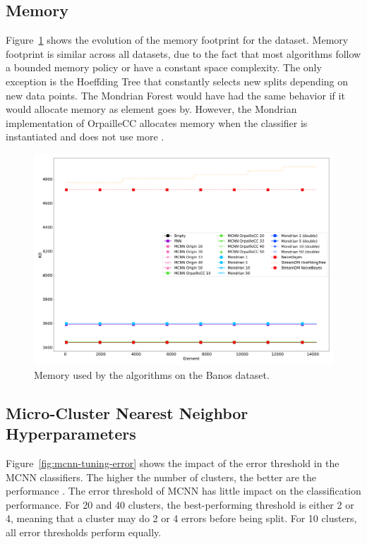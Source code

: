 \subsection{Memory}
\label{sec:result-memory}
Figure~\ref{fig:memory} shows the evolution of the memory footprint for the
\banosdataset dataset.  Memory footprint is similar across all datasets, due to the fact that most algorithms
follow a bounded memory policy or have a constant space complexity. The only
exception is the Hoeffding Tree  that constantly
selects new splits depending on 
new data points. The Mondrian Forest would have had the same behavior if it
would allocate memory as element goes by. However, the Mondrian implementation
of OrpailleCC allocates memory when the classifier is instantiated and does not
use more .

\begin{figure}
	\includegraphics[width=\linewidth]{figures/results/banos_3_memory.png}
	\caption{Memory used by the algorithms on the Banos dataset. }
	\label{fig:memory}
\end{figure}


\subsection{Micro-Cluster Nearest Neighbor Hyperparameters}

Figure~\ref{fig:mcnn-tuning-error} shows the impact of the error threshold
in the MCNN classifiers. The higher the number of clusters, the better are
the performance . The error
threshold of MCNN has little impact on the classification performance. For
20 and 40 clusters, the best-performing threshold is either 2 or 4, meaning
that a cluster may do 2 or 4 errors before being split. For 10 clusters,
all error thresholds perform equally.

